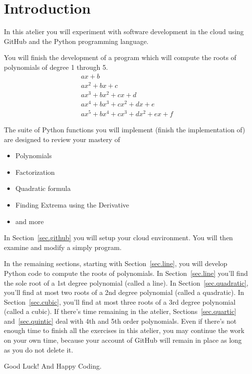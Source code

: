 \section{Introduction}
\label{sec.intro}

In this atelier you will experiment with software development
in the cloud using GitHub and the Python programming language.

You will finish the development of a program which will compute the
roots of polynomials of degree 1 through 5.
\begin{align*}
  a x + b\\
  a x^2 + b x + c\\
  a x^3 + b x^2 + c x + d\\
  a x^4 + b x^3 + c x^2 + d x + e\\
  a x^5 + b x^4 + c x^3 + d x^2 + e x + f
\end{align*}

The suite of Python functions you will implement (finish the
implementation of) are designed to review your mastery of
\begin{itemize}
\item Polynomials
\item Factorization
\item Quadratic formula
\item Finding Extrema using the Derivative
\item and more
\end{itemize}

In Section~\ref{sec.github} you will setup your cloud environment. You
will then examine and modify a simply  program.

In the remaining sections, starting with Section~\ref{sec.line}, you
will develop Python code to compute the roots of polynomials.  In
Section~\ref{sec.line} you'll find the sole root of a 1st degree
polynomial (called a line).  In Section~\ref{sec.quadratic}, you'll
find at most two roots of a 2nd degree polynomial (called a
quadratic). In Section~\ref{sec.cubic}, you'll find at most three
roots of a 3rd degree polynomial (called a cubic).  If there's time
remaining in the atelier, Sections~\ref{sec.quartic}
and~\ref{sec.quintic} deal with 4th and 5th order polynomials.  Even
if there's not enough time to finish all the exercises in this
atelier, you may continue the work on your own time, because your
account of GitHub will remain in place as long as you do not delete
it.

Good Luck! And Happy Coding.


